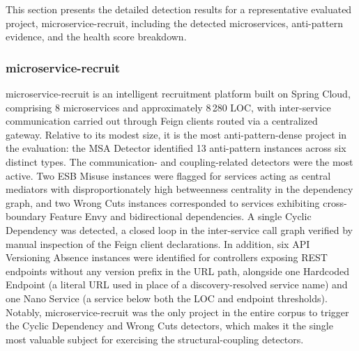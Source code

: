 \par This section presents the detailed detection results for a representative evaluated project, microservice-recruit, including the detected microservices, anti-pattern evidence, and the health score breakdown.

\subsubsection{microservice-recruit}
\label{subsubsec:results-microservice-recruit}

\par microservice-recruit is an intelligent recruitment platform built on Spring Cloud, comprising 8 microservices and approximately 8\,280 LOC, with inter-service communication carried out through Feign clients routed via a centralized gateway. Relative to its modest size, it is the most anti-pattern-dense project in the evaluation: the MSA Detector identified 13 anti-pattern instances across six distinct types. The communication- and coupling-related detectors were the most active. Two ESB Misuse instances were flagged for services acting as central mediators with disproportionately high betweenness centrality in the dependency graph, and two Wrong Cuts instances corresponded to services exhibiting cross-boundary Feature Envy and bidirectional dependencies. A single Cyclic Dependency was detected, a closed loop in the inter-service call graph verified by manual inspection of the Feign client declarations. In addition, six API Versioning Absence instances were identified for controllers exposing REST endpoints without any version prefix in the URL path, alongside one Hardcoded Endpoint (a literal URL used in place of a discovery-resolved service name) and one Nano Service (a service below both the LOC and endpoint thresholds). Notably, microservice-recruit was the only project in the entire corpus to trigger the Cyclic Dependency and Wrong Cuts detectors, which makes it the single most valuable subject for exercising the structural-coupling detectors.

